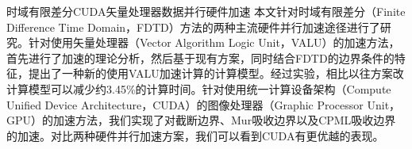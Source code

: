 
\begin{Cabstract}{时域有限差分}{CUDA}{矢量处理器}{数据并行}{硬件加速}
本文针对时域有限差分（Finite Difference Time Domain，FDTD）方法的两种主流硬件并行加速途径进行了研究。针对使用矢量处理器（Vector Algorithm Logic Unit，VALU）的加速方法，首先进行了加速的理论分析，然后基于现有方案，同时结合FDTD的边界条件的特征，提出了一种新的使用VALU加速计算的计算模型。经过实验，相比以往方案改计算模型可以减少约3.45\%的计算时间。针对使用统一计算设备架构（Compute Unified Device Architecture，CUDA）的图像处理器（Graphic Processor Unit，GPU）的加速方法，我们实现了对截断边界、Mur吸收边界以及CPML吸收边界的加速。对比两种硬件并行加速方案，我们可以看到CUDA有更优越的表现。
\end{Cabstract}
